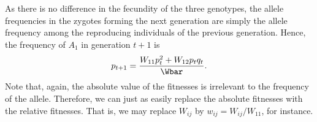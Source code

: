 

As there is no difference in the fecundity of the three genotypes, the
allele frequencies in the zygotes forming the next generation are simply the
allele frequency among the reproducing individuals of the previous generation. Hence, the frequency of $A_1$ in generation $t+1$ is
\begin{equation}
	p_{t+1} = \frac{W_{11} p_t^2 + W_{12} p_tq_t}{\Wbar}
	\label{pgen_dip}.
\end{equation}
 Note that, again, the absolute value of the fitnesses is irrelevant to
the frequency of the allele. Therefore, we can just as easily replace
the absolute fitnesses with the relative fitnesses. That is, we may replace $W_{ij}$ by $w_{ij} = W_{ij}/W_{11}$, for instance. \\

